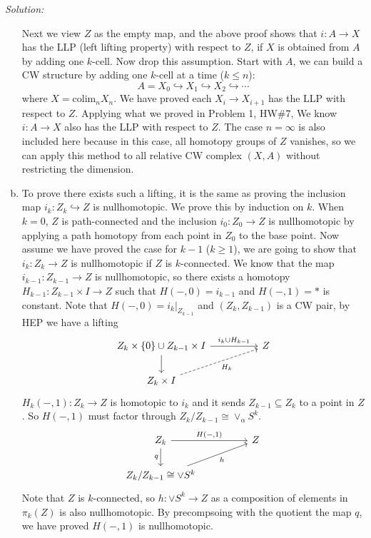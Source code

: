 \documentclass[a4paper, 12pt]{article}
\newenvironment{solution}
    {\textit{Solution:}}
    {}
\newcommand{\colim}{\text{colim}}
\begin{document}
\begin{solution}
\begin{enumerate}[(a)]
Next we view \(Z\) as the empty map, and the above proof shows that \(i:A\rightarrow X\) has the LLP (left lifting property) with respect to \(Z\), if \(X\) is obtained from \(A\) by adding one \(k\)-cell. Now drop this assumption. Start with \(A\), we can build a CW structure by adding one \(k\)-cell at a time (\(k\leq n\)): 
\[A=X_0\hookrightarrow X_1\hookrightarrow X_2\hookrightarrow \cdots\]
where \(X=\colim_n X_n\). We have proved each \(X_i\rightarrow X_{i+1}\) has the LLP with respect to \(Z\). Applying what we proved in Problem 1, HW\#7, We know \(i:A\rightarrow X\) also has the LLP with respect to \(Z\). The case \(n=\infty\) is also included here because in this case, all homotopy groups of \(Z\) vanishes, so we can apply this method 
to all relative CW complex \((X,A)\) without restricting the dimension. 
\item To prove there exists such a lifting, it is the same as proving the inclusion map \(i_k:Z_k\hookrightarrow Z\) is nullhomotopic. We prove this by induction on \(k\). When \(k=0\), \(Z\) is path-connected and the inclusion \(i_0:Z_0\rightarrow Z\) is nullhomotopic by applying a path homotopy from each point 
in \(Z_0\) to the base point. Now assume we have proved the case for \(k-1\) (\(k\geq 1\)), we are going to show that \(i_k:Z_k\rightarrow Z\) is nullhomotopic if \(Z\) is \(k\)-connected. We know that the map \(i_{k-1}:Z_{k-1}\rightarrow Z\) is nullhomotopic, so there exists a homotopy 
\(H_{k-1}:Z_{k-1}\times I\rightarrow Z\) such that \(H(-,0)=i_{k-1}\) and \(H(-,1)=*\) is constant. Note that \(H(-,0)=i_k|_{Z_{k-1}}\) and \((Z_k,Z_{k-1})\) is a CW pair, by HEP we have a lifting 
\[\begin{tikzcd}
	{Z_k\times\left\{0\right\}\cup Z_{k-1}\times I} && Z \\
	{Z_k\times I}
	\arrow["{i_k\cup H_{k-1}}", from=1-1, to=1-3]
	\arrow[from=1-1, to=2-1]
	\arrow["{H_k}"', dashed, from=2-1, to=1-3]
\end{tikzcd}\]
\(H_k(-,1):Z_k\rightarrow Z\) is homotopic to \(i_k\) and it sends \(Z_{k-1}\subseteq Z_k\) to a point in \(Z\). So \(H(-,1)\) must factor through \(Z_k/Z_{k-1}\cong \vee_\alpha S^k\).
\[\begin{tikzcd}
	{Z_k} && Z \\
	{Z_k/Z_{k-1}\cong \vee S^k}
	\arrow["{H(-,1)}", from=1-1, to=1-3]
	\arrow["q"', from=1-1, to=2-1]
	\arrow["h"', from=2-1, to=1-3]
\end{tikzcd}\]
Note that \(Z\) is \(k\)-connected, so \(h:\vee S^k\rightarrow Z\) as a composition of elements in \(\pi_k(Z)\) is also nullhomotopic. By precompsoing with the quotient the map \(q\), we have proved \(H(-,1)\) is nullhomotopic. 


\end{enumerate}
\end{solution}
\end{document}
